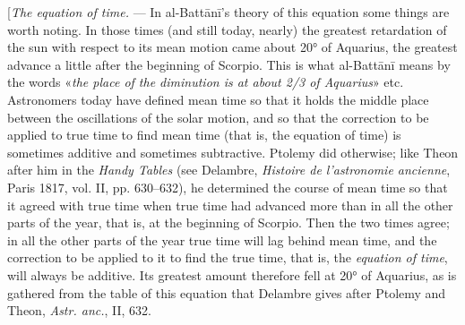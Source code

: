\documentclass[11pt]{article}
\newcommand{\Pg}[1]{\marginpar{\footnotesize\color{gray}#1}}
\begin{document}
\par \Pg{I 222}[\emph{The equation of time.} — In al-Battānī's theory of this equation some things are worth noting. In those times (and still today, nearly) the greatest retardation of the sun with respect to its mean motion came about 20° of Aquarius, the greatest advance a little after the beginning of Scorpio. This is what al-Battānī means by the words «\emph{the place of the diminution is at about 2/3 of Aquarius}» etc. Astronomers today have defined mean time so that it holds the middle place between the oscillations of the solar motion, and so that the correction to be applied to true time to find mean time (that is, the equation of time) is sometimes additive and sometimes subtractive. Ptolemy did otherwise; like Theon after him in the \emph{Handy Tables} (see Delambre, \emph{Histoire de l’astronomie ancienne}, Paris 1817, vol. II, pp. 630–632), he determined the course of mean time so that it agreed with true time when true time had advanced more than in all the other parts of the year, that is, at the beginning of Scorpio. Then the two times agree; in all the other parts of the year true time will lag behind mean time, and the correction to be applied to it to find the true time, that is, the \emph{equation of time}, will always be additive. Its greatest amount therefore fell at 20° of Aquarius, as is gathered from the table of this equation that Delambre gives after Ptolemy and Theon, \emph{Astr. anc.}, II, 632.\par
\end{document}
